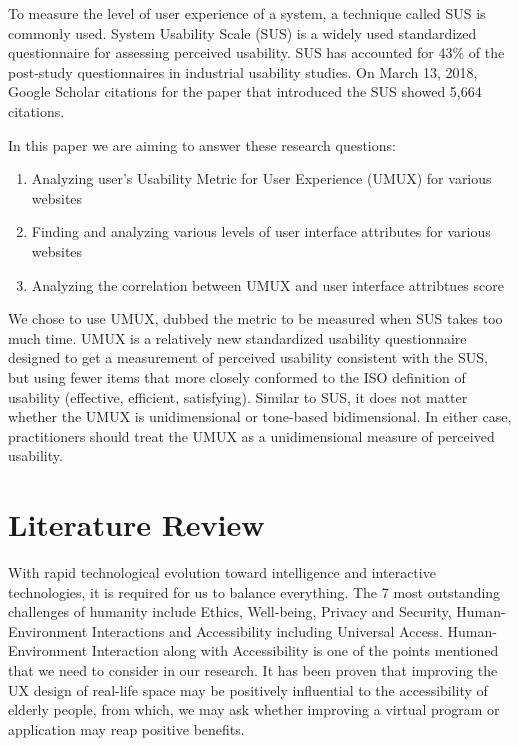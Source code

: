 \documentclass[conference]{IEEEtran}
\begin{document}
To measure the level of user experience of a system, a technique called SUS is commonly used. System Usability Scale (SUS) is a widely used standardized questionnaire for assessing perceived usability\cite{JamesRLewis2018}.  SUS has accounted for 43\% of the post-study questionnaires in industrial usability studies\cite{JamesRLewis2018}. On March 13, 2018, Google Scholar citations for the paper that introduced the SUS showed 5,664 citations\cite{JamesRLewis2018}.

In this paper we are aiming to answer these research questions:

\begin{enumerate}
    \item Analyzing user's Usability Metric for User Experience (UMUX) for various websites
    \item Finding and analyzing various levels of user interface attributes for various websites
    \item Analyzing the correlation between UMUX and user interface attribtues score
\end{enumerate}


We chose to use UMUX, dubbed the metric to be measured when SUS takes too much time\cite{Lewis2013UMUXLITEWT}. UMUX is a relatively new standardized usability questionnaire designed to get a measurement of perceived usability consistent with the SUS\cite{Berkman2016ReassessingTU, Lewis2019MeasuringPU}, but using fewer items that more closely conformed to the ISO definition of usability (effective, efficient, satisfying). Similar to SUS, it does not matter whether the UMUX is unidimensional or tone-based bidimensional\cite{Lewis2018MeasuringPU}. In either case, practitioners should treat the UMUX as a unidimensional measure of perceived usability\cite{Lewis2018MeasuringPU}.

\section{Literature Review}

With rapid technological evolution toward intelligence and interactive technologies, it is required for us to balance everything. The 7 most outstanding challenges of humanity include Ethics, Well-being, Privacy and Security, Human-Environment Interactions and Accessibility including Universal Access\cite{Stephanidis2019SevenHG}. Human-Environment Interaction along with Accessibility is one of the points mentioned that we need to consider in our research. It has been proven that improving the UX design of real-life space may be positively influential to the accessibility of elderly people\cite{Yoo2021TheEO}, from which, we may ask whether improving a virtual program or application may reap positive benefits.
\end{document}
